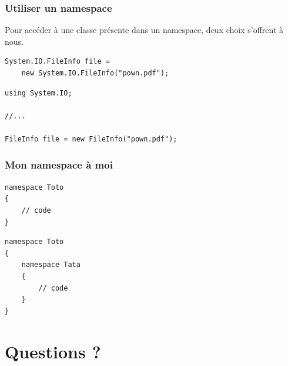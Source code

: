 \documentclass{beamer}
\begin{document}
\begin{frame}[fragile]
\frametitle{Utiliser un namespace}
Pour accéder à une classe présente dans un namespace, deux choix s'offrent à nous.
\begin{lstlisting}
System.IO.FileInfo file = 
    new System.IO.FileInfo("pown.pdf");
\end{lstlisting}
\pause
\begin{lstlisting}
using System.IO;

//...

FileInfo file = new FileInfo("pown.pdf");
\end{lstlisting}
\end{frame}

\begin{frame}[fragile]
\frametitle{Mon namespace à moi}
\begin{lstlisting}
namespace Toto
{
    // code
}
\end{lstlisting}
\pause
\begin{lstlisting}
namespace Toto
{
    namespace Tata
    {
        // code
    }
}
\end{lstlisting}
\end{frame}

\section{Questions ?}
\end{document}
